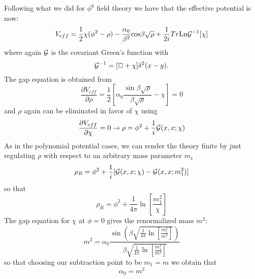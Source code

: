 \documentclass[a4paper,prd,preprint,superscriptaddress,showpacs,byrevtex]{revtex4}
\begin{document}
Following what we did for $\phi^6$ field theory we have that the effective
potential is now:
\begin{equation}
V_{eff} =  \frac{1}{2} \chi( \phi^2 - \rho)  -\frac{\alpha_0}{\beta^2} {\rm
cos} \beta \sqrt{\rho}+ \frac{1}{2i} Tr {\rm Ln} {\cal G}^{-1}[\chi]
\end{equation}
where again  $\cal G$ is the covariant Green's function with
\begin{equation}
{\cal G} ^{-1}= [\Box + \chi] \delta^2 (x-y).
\end{equation}
The gap equation  is obtained from
\begin{equation}
\frac{\partial V_{eff}}{\partial \rho} = \frac{1}{2} [\alpha_0 \frac {\sin \beta
\sqrt{\rho}} {\beta \sqrt{\rho}} -
\chi]= 0
\end{equation}
and $\rho$ again can be eliminated in favor of $\chi$ using
\begin{equation}
\frac{\partial V_{eff}}{\partial \chi} =0 \rightarrow \rho=\phi^2 + \frac{1}{i}
{\cal G}(x,x;\chi) \end{equation}
As in the polynomial potential cases, we can render the theory finite by
just
regulating $\rho$ with respect to an arbitrary mass parameter $m_1$
\begin{equation} \rho_R=\phi^2 + \frac{1}{i} [{\cal G} (x,x;\chi)-
{\cal G(} x,x;m_1^2)] \end{equation}
so that
\begin{equation}
\rho_R = \phi^2 + \frac{1}{4 \pi} \ln[\frac{m_1^2}{\chi}]
\end{equation}
The gap equation for $\chi$ at $\phi=0$ gives the renormalized mass $m^2$:
\begin{equation}
m^2 = \alpha_0 \frac {\sin \left( \beta \sqrt{ \frac{1}{4 \pi}
\ln[\frac{m_1^2}{m^2}]} \right)}{\beta \sqrt{
\frac{1}{4
\pi}
\ln[\frac{m_1^2}{m^2}]}}
\end{equation}
so that choosing our subtraction point to be $m_1=m$ we obtain that
\begin{equation}
\alpha_0 = m^2
\end{equation}
\end{document}
